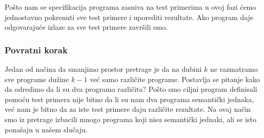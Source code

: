 Pošto nam se specifikacija programa zasniva na test primerima u ovoj fazi ćemo jednostavno pokrenuti sve test primere i uporediti rezultate. Ako program daje odgovarajuće izlaze za sve test primere završili smo.


\subsubsection*{Povratni korak}


Jedan od načina da smanjimo prostor pretrage je da na dubini $k$ ne razmatramo sve programe dužine $k-1$ već samo različite programe. Postavlja se pitanje kako da odredimo da li su dva programa različita? Pošto smo ciljni program definisali pomoću test primera nije bitno da li su nam dva programa semantički jednaka, već nam je bitno da za iste test primere daju različite rezultate. Na ovaj način smo iz pretrage izbacili mnogo programa koji nisu semantički jednaki, ali se isto ponašaju u našem slučaju.
